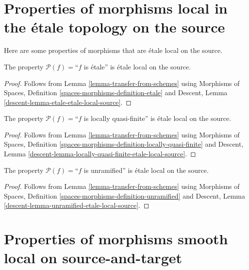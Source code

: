 \section{Properties of morphisms local in the \'etale topology on the source}
\label{section-etale-local-source}

\noindent
Here are some properties of morphisms that are \'etale local on the source.

\begin{lemma}
\label{lemma-etale-etale-local-source}
The property $\mathcal{P}(f)=$``$f$ is \'etale''
is \'etale local on the source.
\end{lemma}

\begin{proof}
Follows from
Lemma \ref{lemma-transfer-from-schemes}
using
Morphisms of Spaces,
Definition \ref{spaces-morphisms-definition-etale}
and
Descent, Lemma \ref{descent-lemma-etale-etale-local-source}.
\end{proof}

\begin{lemma}
\label{lemma-locally-quasi-finite-etale-local-source}
The property $\mathcal{P}(f)=$``$f$ is locally quasi-finite''
is \'etale local on the source.
\end{lemma}

\begin{proof}
Follows from
Lemma \ref{lemma-transfer-from-schemes}
using
Morphisms of Spaces,
Definition \ref{spaces-morphisms-definition-locally-quasi-finite}
and
Descent, Lemma \ref{descent-lemma-locally-quasi-finite-etale-local-source}.
\end{proof}

\begin{lemma}
\label{lemma-unramified-etale-local-source}
The property $\mathcal{P}(f)=$``$f$ is unramified''
is \'etale local on the source.
\end{lemma}

\begin{proof}
Follows from
Lemma \ref{lemma-transfer-from-schemes}
using
Morphisms of Spaces, Definition \ref{spaces-morphisms-definition-unramified}
and
Descent, Lemma \ref{descent-lemma-unramified-etale-local-source}.
\end{proof}




\section{Properties of morphisms smooth local on source-and-target}
\label{section-properties-local-source-target}


